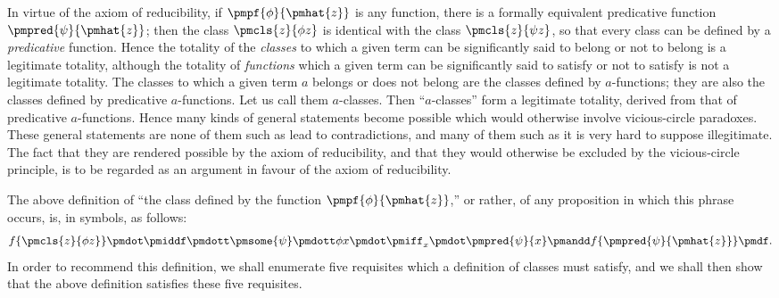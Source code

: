\documentclass[letterpaper,12pt,openany,leqno]{book}
\newcommand{\pagefirst}[1]{\marginnote[\boxed{\text{#1}}]{\boxed{\text{#1}}}}
\begin{document}
In virtue of the axiom of reducibility, if $\pmpf{\phi}{\pmhat{z}}$ is any function, there is a formally equivalent predicative function $\pmpred{\psi}{\pmhat{z}}$; then the class $\pmcls{z}{\phi z}$ is identical with the class $\pmcls{z}{\psi z}$, so that every class can be defined by a \textit{predicative} function. Hence the totality of the \textit{classes} to which a given term can be significantly said to belong or not to belong is a legitimate totality, although the totality of \textit{functions} which a given term can be significantly said to satisfy or not to satisfy is not a legitimate totality. The classes to which a given term $a$ belongs or does not belong are the classes defined by $a$-functions; they are also the classes defined by predicative $a$-functions. Let us call them $a$-classes. Then ``$a$-classes'' form a legitimate totality, derived from that of predicative $a$-functions. Hence many kinds of general statements become possible which would otherwise involve vicious-circle paradoxes. These general statements are none of them such as lead to contradictions, and many of them such as it is very hard to suppose illegitimate. The fact that they are rendered possible by the axiom of reducibility, and that they would otherwise be excluded by the vicious-circle principle, is to be regarded as an argument in favour of the axiom of reducibility.

\pagefirst{80} The above definition of ``the class defined by the function $\pmpf{\phi}{\pmhat{z}}$,'' or rather, of any proposition in which this phrase occurs, is, in symbols, as follows: 
\[
	f\{\pmcls{z}{\phi z}\} \pmdot \pmiddf \pmdott \pmsome{\psi}\pmdott \phi x \pmdot \pmiff_x \pmdot \pmpred{\psi}{x}\pmandd f\{\pmpred{\psi}{\pmhat{z}}\} \pmdf.
\]
In order to recommend this definition, we shall enumerate five requisites which a definition of classes must satisfy, and we shall then show that the above definition satisfies these five requisites.
\end{document}
